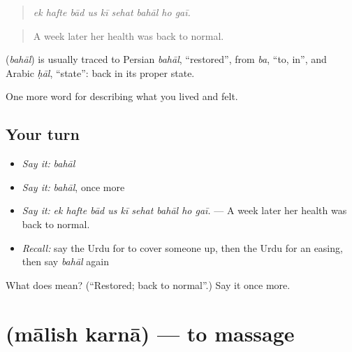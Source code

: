 \begin{quote}
\emph{ek hafte bād us kī sehat bahāl ho gaī.}
\end{quote}

\begin{quote}
A week later her health was back to normal.
\end{quote}

\begin{cousinweb}
\textbf{} (\emph{bahāl}) is usually traced to Persian \emph{bahāl}, \textquotedblleft{}restored\textquotedblright{}, from \emph{ba}, \textquotedblleft{}to, in\textquotedblright{}, and Arabic \emph{ḥāl}, \textquotedblleft{}state\textquotedblright{}: back in its proper state.
\end{cousinweb}

\begin{grammarlens}[title={What you've built}]
One more word for describing what you lived and felt.
\end{grammarlens}

\subsection*{Your turn}
\begin{itemize}
\raggedright
  \item \emph{Say it:} \emph{bahāl}
  \item \emph{Say it:} \emph{bahāl}, once more
  \item \emph{Say it:} \emph{ek hafte bād us kī sehat bahāl ho gaī.} — A week later her health was back to normal.
  \item \emph{Recall:} say the Urdu for to cover someone up, then the Urdu for an easing, then say \emph{bahāl} again
\end{itemize}

\begin{tcolorbox}[breakable,colback=teal!4,colframe=teal!35!black,title={Before you move on}]
What does  mean? (\textquotedblleft{}Restored; back to normal\textquotedblright{}.) Say it once more.
\end{tcolorbox}
\section[\texorpdfstring{\ur{مالش} \ur{کرنا} (mālish karnā)}{مالش کرنا (mālish karnā)}]{  (mālish karnā) — to massage}

\label{lesson:UR-C481-malish-karna}



